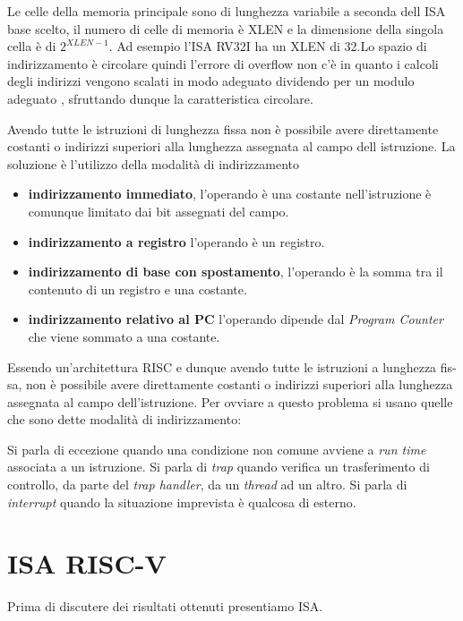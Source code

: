\documentclass[12pt,a4paper]{report}
\begin{document}
Le celle della memoria principale sono di lunghezza variabile a seconda dell ISA base scelto, il numero di celle di memoria è XLEN e la dimensione della singola cella è di $2^{XLEN - 1}$. Ad esempio l'ISA RV32I ha un XLEN di 32.Lo spazio di indirizzamento è circolare quindi l'errore di overflow non c'è in quanto i calcoli degli indirizzi vengono scalati in modo adeguato dividendo per un modulo adeguato , sfruttando dunque la caratteristica circolare.

Avendo tutte le istruzioni di lunghezza fissa non è possibile avere direttamente costanti o indirizzi superiori alla lunghezza assegnata al campo dell istruzione. La soluzione è l'utilizzo della modalità di indirizzamento
\begin{itemize}
	\item \textbf{indirizzamento immediato}, l’operando è una costante nell’istruzione è comunque limitato dai bit assegnati del campo.
	\item \textbf{indirizzamento a registro} l’operando è un registro.
	\item \textbf{indirizzamento di base con spostamento}, l’operando è la somma tra il
contenuto di un registro e una costante.
\item \textbf{indirizzamento relativo al PC} l'operando dipende dal \textit{Program Counter} che viene sommato a una costante.
\end{itemize}

Essendo un’architettura RISC e dunque avendo tutte le istruzioni a lunghezza fis- sa, non è possibile avere direttamente costanti o indirizzi superiori alla lunghezza assegnata al campo dell’istruzione. Per ovviare a questo problema si usano quelle che sono dette modalità di indirizzamento:

Si parla di eccezione quando una condizione non comune avviene a \textit{run time} associata a un istruzione.
Si parla di \textit{trap} quando verifica un trasferimento di controllo, da parte del \textit{trap handler}, da un  \textit{thread} ad un altro. Si parla di \textit{interrupt} quando la situazione imprevista è qualcosa di esterno.

% 
\chapter{ISA RISC-V}
Prima di discutere dei risultati ottenuti presentiamo ISA. 
\end{document}
